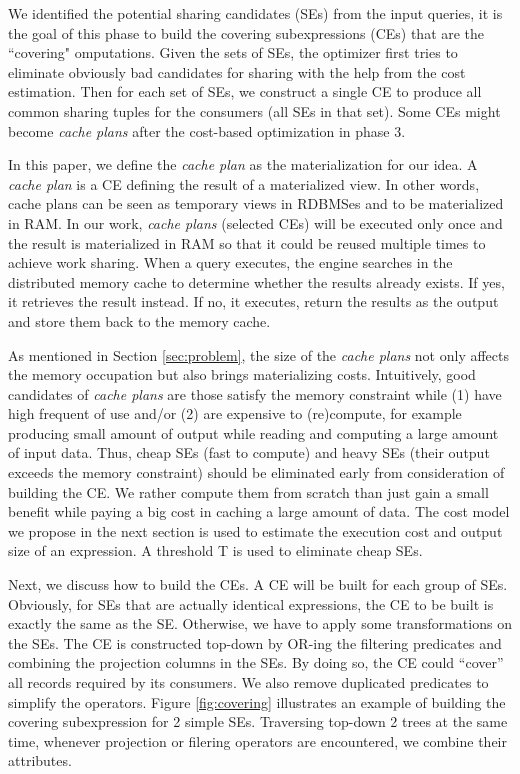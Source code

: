 We identified the potential sharing candidates (SEs) from the input queries, it is the goal of this phase to build the covering subexpressions (CEs) that are the ``covering" omputations. Given the sets of SEs, the optimizer first tries to eliminate obviously bad candidates for sharing with the help from the cost estimation. Then for each set of SEs, we construct a single CE to produce all common sharing tuples for the consumers (all SEs in that set). Some CEs might become \emph{cache plans} after the cost-based optimization in phase 3. 

In this paper, we define the \emph{cache plan} as the materialization for our idea. A \emph{cache plan} is a CE defining the result of a materialized view. In other words, cache plans can be seen as temporary views in RDBMSes and to be materialized in RAM. In our work, \emph{cache plans} (selected CEs) will be executed only once and the result is materialized in RAM so that it could be reused multiple times to achieve work sharing. When a query executes, the engine searches in the distributed memory cache to determine whether the results already exists. If yes, it retrieves the result instead. If no, it executes, return the results as the output and store them back to the memory cache.

As mentioned in Section \ref{sec:problem}, the size of the \emph{cache plans} not only affects the memory occupation but also brings materializing costs. Intuitively, good candidates of \emph{cache plans} are those satisfy the memory constraint while (1) have high frequent of use and/or (2) are expensive to (re)compute, for example producing small amount of output while reading and computing a large amount of input data. Thus, cheap SEs (fast to compute) and heavy SEs (their output exceeds the memory constraint) should be eliminated early from consideration of building the CE. We rather compute them from scratch than just gain a small benefit while paying a big cost in caching a large amount of data. The cost model we propose in the next section is used to estimate the execution cost and output size of an expression. A threshold T is used to eliminate cheap SEs. 

Next, we discuss how to build the CEs. A CE will be built for each group of SEs. Obviously, for SEs that are actually identical expressions, the CE to be built is exactly the same as the SE. Otherwise, we have to apply some transformations on the SEs. The CE is constructed top-down by OR-ing the filtering predicates and combining the projection columns in the SEs. By doing so, the CE could ``cover'' all records required by its consumers. We also remove duplicated predicates to simplify the operators. Figure \ref{fig:covering} illustrates an example of building the covering subexpression for 2 simple SEs. Traversing top-down 2 trees at the same time, whenever projection or filering operators are encountered, we combine their attributes.

